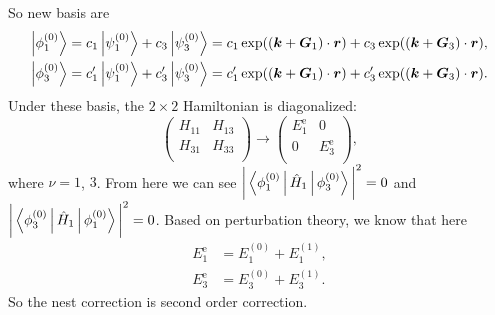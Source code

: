 \documentclass[12pt]{article}
\begin{document}
\begin{enumerate}[(a)]
	      So new basis are
	      \begin{align}
	      	\Ket{\phi_1^{(0)}} & = c_1 \Ket{\psi_1^{(0)}} + c_3 \Ket{\psi_3^{(0)}} = c_1 \exp((\bm{k} + \bm{G}_1) \cdot \bm{r})
	      	+  c_3 \exp((\bm{k} + \bm{G}_3) \cdot \bm{r}), \\
	      	\Ket{\phi_3^{(0)}} & = c_1' \Ket{\psi_1^{(0)}} + c_3' \Ket{\psi_3^{(0)}} =  c_1' \exp((\bm{k} + \bm{G}_1) \cdot \bm{r})
	      	+  c_3' \exp((\bm{k} + \bm{G}_3) \cdot \bm{r}). \\
	      \end{align}
	      Under these basis, the $2\times 2$ Hamiltonian is diagonalized:
	      \begin{equation}
	      	\begin{pmatrix}
	      		H_{11} & H_{13} \\
	      		H_{31} & H_{33} \\
	      	\end{pmatrix}
	      	\rightarrow
	      	\begin{pmatrix}
	      		E_{1}^{\text{e}} & 0                \\
	      		0                & E_{3}^{\text{e}} \\
	      	\end{pmatrix},
	      \end{equation}
	      where $\nu = 1$, $3$. From here we can see $\bigg\lvert \Braket{\phi_1^{(0)} | \hat{H}_1 | \phi_3^{(0)}} \bigg\rvert^2 = 0$ and $\bigg\lvert \Braket{\phi_3^{(0)} | \hat{H}_1 | \phi_1^{(0)}} \bigg\rvert^2 = 0$.
	      Based on perturbation theory, we know that
	      here
	      \begin{align}
	      	E_1^{\text{e}} & = E_1^{(0)} + E_1^{(1)}, \\
	      	E_3^{\text{e}} & = E_3^{(0)} + E_3^{(1)}.
	      \end{align}
	      So the nest correction is second order correction.


\end{enumerate}
\end{document}
